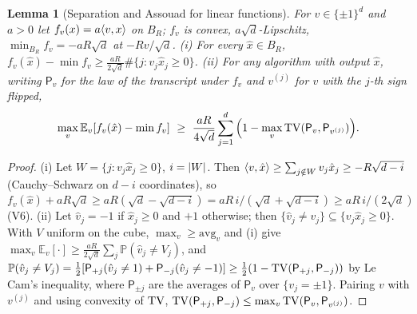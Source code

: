 \documentclass[11pt,a4paper]{article}
\numberwithin{equation}{section}
\newtheorem{lemma}[theorem]{Lemma}
\theoremstyle{definition}
\theoremstyle{remark}
\newcommand{\E}{\mathbb E}\newcommand{\R}{\mathbb R}\newcommand{\Z}{\mathbb Z}\newcommand{\Prob}{\mathbb P}
\begin{document}
\begin{lemma}[Separation and Assouad for linear functions]\label{lem:assouad}
For $v\in\{\pm1\}^d$ and $a>0$ let $f_v(x)=a\langle v,x\rangle$ on $B_R$; $f_v$ is convex, $a\sqrt d$-Lipschitz, $\min_{B_R}f_v=-aR\sqrt d$ at $-Rv/\sqrt d$. (i) For every $\hat x\in B_R$, $f_v(\hat x)-\min f_v\ge\frac{aR}{2\sqrt d}\#\{j:v_j\hat x_j\ge0\}$. (ii) For any algorithm with output $\hat x$, writing $\mathsf P_v$ for the law of the transcript under $f_v$ and $v^{(j)}$ for $v$ with the $j$-th sign flipped,
\[
\max_v\E_v[f_v(\hat x)-\min f_v]\ \ge\ \frac{aR}{4\sqrt d}\sum_{j=1}^d\Big(1-\max_{v}\TV(\mathsf P_v,\mathsf P_{v^{(j)}})\Big).
\]
\end{lemma}
\begin{proof}
(i) Let $W=\{j:v_j\hat x_j\ge0\}$, $i=\lvert W\rvert$. Then $\langle v,\hat x\rangle\ge\sum_{j\notin W}v_j\hat x_j\ge-R\sqrt{d-i}$ (Cauchy--Schwarz on $d-i$ coordinates), so $f_v(\hat x)+aR\sqrt d\ge aR(\sqrt d-\sqrt{d-i})=aR\,i/(\sqrt d+\sqrt{d-i})\ge aR\,i/(2\sqrt d)$ (V6). (ii) Let $\hat v_j=-1$ if $\hat x_j\ge0$ and $+1$ otherwise; then $\{\hat v_j\ne v_j\}\subseteq\{v_j\hat x_j\ge0\}$. With $V$ uniform on the cube, $\max_v\ge\mathrm{avg}_v$ and (i) give $\max_v\E_v[\cdot]\ge\frac{aR}{2\sqrt d}\sum_j\Prob(\hat v_j\ne V_j)$, and $\Prob(\hat v_j\ne V_j)=\frac12[\mathsf P_{+j}(\hat v_j\ne1)+\mathsf P_{-j}(\hat v_j\ne-1)]\ge\frac12(1-\TV(\mathsf P_{+j},\mathsf P_{-j}))$ by Le Cam's inequality, where $\mathsf P_{\pm j}$ are the averages of $\mathsf P_v$ over $\{v_j=\pm1\}$. Pairing $v$ with $v^{(j)}$ and using convexity of $\mathrm{TV}$, $\mathrm{TV}(\mathsf P_{+j},\mathsf P_{-j})\le\max_v\mathrm{TV}(\mathsf P_v,\mathsf P_{v^{(j)}})$.
\end{proof}
\end{document}
